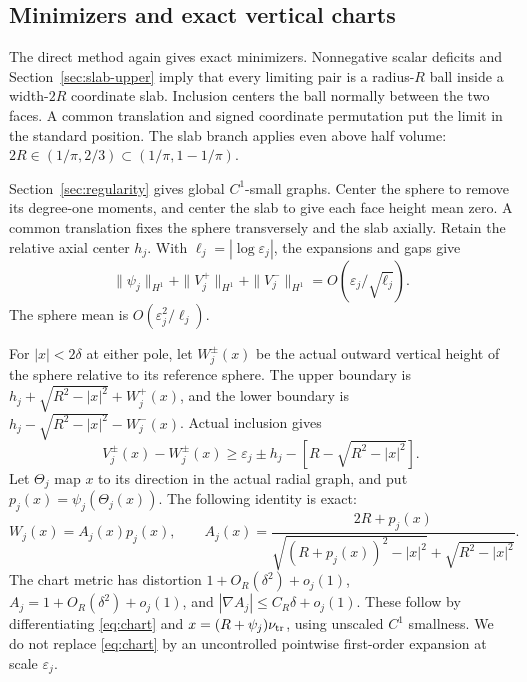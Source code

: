 \documentclass[11pt,reqno]{amsart}
\numberwithin{equation}{section}
\theoremstyle{definition}
\theoremstyle{remark}
\newcommand{\eps}{\varepsilon}
\begin{document}
\subsection{Minimizers and exact vertical charts}
The direct method again gives exact minimizers. Nonnegative scalar
deficits and Section~\ref{sec:slab-upper} imply that every limiting
pair is a radius-$R$ ball inside a width-$2R$ coordinate slab.
Inclusion centers the ball normally between the two faces. A common
translation and signed coordinate permutation put the limit in the
standard position. The slab branch applies even above half volume:
$2R\in(1/\pi,2/3)\subset(1/\pi,1-1/\pi)$.

Section~\ref{sec:regularity} gives global $C^1$-small graphs.
Center the sphere to remove its degree-one moments, and center the
slab to give each face height mean zero. A common translation fixes
the sphere transversely and the slab axially. Retain the relative axial
center $h_j$. With $\ell_j=|\log\eps_j|$, the expansions and gaps give
\begin{equation}\label{eq:scale-slab}
 \|\psi_j\|_{H^1}+\|V_j^+\|_{H^1}+\|V_j^-\|_{H^1}
 =O(\eps_j/\sqrt{\ell_j}).
\end{equation}
The sphere mean is $O(\eps_j^2/\ell_j)$.

For $|x|<2\delta$ at either pole, let $W_j^\pm(x)$ be the actual
outward vertical height of the sphere relative to its reference
sphere. The upper boundary is
$h_j+\sqrt{R^2-|x|^2}+W_j^+(x)$, and the lower boundary is
$h_j-\sqrt{R^2-|x|^2}-W_j^-(x)$. Actual inclusion gives
\begin{equation}\label{eq:vertical-obstacle}
 V_j^\pm(x)-W_j^\pm(x)
 \ge\eps_j\pm h_j-[R-\sqrt{R^2-|x|^2}].
\end{equation}
Let $\Theta_j$ map $x$ to its direction in the actual radial graph, and put
$p_j(x)=\psi_j(\Theta_j(x))$. The following identity is exact:
\begin{equation}\label{eq:chart}
 W_j(x)=A_j(x)p_j(x),\qquad
 A_j(x)=\frac{2R+p_j(x)}{\sqrt{(R+p_j(x))^2-|x|^2}
 +\sqrt{R^2-|x|^2}}.
\end{equation}
The chart metric has distortion $1+O_R(\delta^2)+o_j(1)$,
$A_j=1+O_R(\delta^2)+o_j(1)$, and
$|\nabla A_j|\le C_R\delta+o_j(1)$.
These follow by differentiating \eqref{eq:chart} and
$x=(R+\psi_j)\nu_{\rm tr}$, using unscaled $C^1$ smallness.
We do not replace \eqref{eq:chart} by an uncontrolled pointwise
first-order expansion at scale $\eps_j$.
\end{document}
